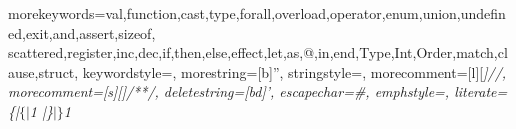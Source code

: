 \usepackage[T1]{fontenc}
\usepackage[scaled=0.82]{beramono}
\usepackage{amssymb}


  { morekeywords={val,function,cast,type,forall,overload,operator,enum,union,undefined,exit,and,assert,sizeof,
      scattered,register,inc,dec,if,then,else,effect,let,as,@,in,end,Type,Int,Order,match,clause,struct},
    keywordstyle={\bf\ttfamily},
    morestring=[b]'',
    stringstyle={\ttfamily\color{red}},
    morecomment=[l][\itshape\color{DarkGreen}]{//},
    morecomment=[s][\itshape\color{DarkGreen}]{/*}{*/},
    deletestring=[bd]{'},
    escapechar=\#,
    emphstyle={\it},
    literate=
      {\{|}{{$\{|$}}1
      {|\}}{{$|\}$}}1
  }


{
  \newcommand{\sailcode}[1]{}
  \newcommand{\sailnote}[1]{}
  \newcommand{\sailval}[1]{}
  \newcommand{\sailvalandfun}[1]{}
}

\newcommand{\sailwithnote}[2]{\sailnote{#1}\sailcode{#2}}

\newenvironment{formalspec}
{ \vspace{-0.2in}
  \begin{quotation}
  \noindent
  \small \em
  \rule{\linewidth}{1pt}\\
}
{
  \rule{\linewidth}{1pt}
  \end{quotation}
  \vspace{-0.2in}
}

